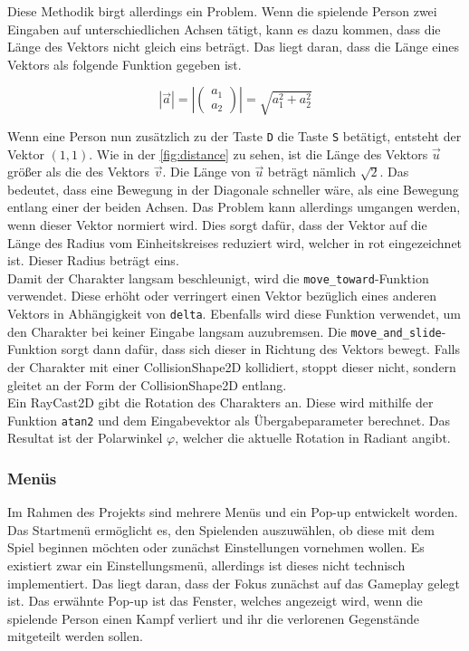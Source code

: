 Diese Methodik birgt allerdings ein Problem.
Wenn die spielende Person zwei Eingaben auf unterschiedlichen Achsen tätigt, kann es dazu kommen, dass die Länge des Vektors nicht gleich eins beträgt.
Das liegt daran, dass die Länge eines Vektors als folgende Funktion gegeben ist\cite[S.16]{vector-math}.

\setcounter{equation}{0}
\begin{equation}
    |\vec{a}| = |\left(\begin{array}{c} a_1 \\ a_2 \end{array}\right)| = \sqrt{a_1^2 + a_2^2}
\end{equation}

Wenn eine Person nun zusätzlich zu der Taste \texttt{D} die Taste \texttt{S} betätigt, entsteht der Vektor $(1, 1)$.
Wie in der \autoref{fig:distance} zu sehen, ist die Länge des Vektors $\vec{u}$ größer als die des Vektors $\vec{v}$.
Die Länge von $\vec{u}$ beträgt nämlich $\sqrt{2}$.
Das bedeutet, dass eine Bewegung in der Diagonale schneller wäre, als eine Bewegung entlang einer der beiden Achsen.
Das Problem kann allerdings umgangen werden, wenn dieser Vektor normiert wird\cite[S.22]{vector-math}.
Dies sorgt dafür, dass der Vektor auf die Länge des Radius vom Einheitskreises reduziert wird, welcher in rot eingezeichnet ist.
Dieser Radius beträgt eins.\\

Damit der Charakter langsam beschleunigt, wird die \texttt{move\_toward}-Funktion verwendet\cite{godot-move-toward}.
Diese erhöht oder verringert einen Vektor bezüglich eines anderen Vektors in Abhängigkeit von \texttt{delta}.
Ebenfalls wird diese Funktion verwendet, um den Charakter bei keiner Eingabe langsam auzubremsen.
Die \texttt{move\_and\_slide}-Funktion sorgt dann dafür, dass sich dieser in Richtung des Vektors bewegt\cite{godot-move-and-slide}.
Falls der Charakter mit einer CollisionShape2D kollidiert, stoppt dieser nicht, sondern gleitet an der Form der CollisionShape2D entlang.\\

Ein RayCast2D gibt die Rotation des Charakters an.
Diese wird mithilfe der Funktion \texttt{atan2} und dem Eingabevektor als Übergabeparameter berechnet\cite{godot-builtins}.
Das Resultat ist der Polarwinkel $\varphi$, welcher die aktuelle Rotation in Radiant angibt.\\

\subsubsection{Menüs}
Im Rahmen des Projekts sind mehrere Menüs und ein Pop-up entwickelt worden.
Das Startmenü ermöglicht es, den Spielenden auszuwählen, ob diese mit dem Spiel beginnen möchten oder zunächst Einstellungen vornehmen wollen.
Es existiert zwar ein Einstellungsmenü, allerdings ist dieses nicht technisch implementiert.
Das liegt daran, dass der Fokus zunächst auf das Gameplay gelegt ist.
Das erwähnte Pop-up ist das Fenster, welches angezeigt wird, wenn die spielende Person einen Kampf verliert und ihr die verlorenen Gegenstände mitgeteilt werden sollen. \\

